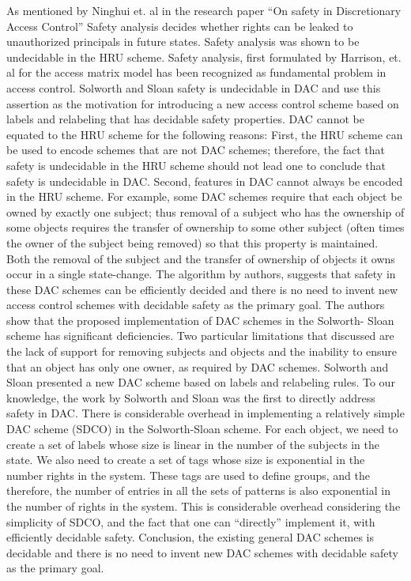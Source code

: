\documentclass{report}
\begin{document}
As mentioned by Ninghui et. al in the research paper “On safety in Discretionary Access
Control” Safety analysis decides whether rights can be leaked to unauthorized principals in
future states. Safety analysis was shown to be undecidable in the HRU scheme. Safety analysis,
first formulated by Harrison, et. al for the access matrix model has been recognized as
fundamental problem in access control. Solworth and Sloan safety is undecidable in DAC and
use this assertion as the motivation for introducing a new access control scheme based on
labels and relabeling that has decidable safety properties.
DAC cannot be equated to the HRU scheme for the following reasons:
First, the HRU scheme can be used to encode schemes that are not DAC schemes; therefore,
the fact that safety is undecidable in the HRU scheme should not lead one to conclude that
safety is undecidable in DAC.
Second, features in DAC cannot always be encoded in the HRU scheme. For example, some DAC
schemes require that each object be owned by exactly one subject; thus removal of a subject
who has the ownership of some objects requires the transfer of ownership to some other
subject (often times the owner of the subject being removed) so that this property is
maintained. Both the removal of the subject and the transfer of ownership of objects it owns
occur in a single state-change.
The algorithm by authors, suggests that safety in these DAC schemes can be efficiently decided
and there is no need to invent new access control schemes with decidable safety as the primary
goal. The authors show that the proposed implementation of DAC schemes in the Solworth-
Sloan scheme has significant deficiencies. Two particular limitations that discussed are the lack
of support for removing subjects and objects and the inability to ensure that an object has only
one owner, as required by DAC schemes. Solworth and Sloan presented a new DAC scheme
based on labels and relabeling rules. To our knowledge, the work by Solworth and Sloan was
the first to directly address safety in DAC.
There is considerable overhead in implementing a relatively simple DAC scheme (SDCO) in the
Solworth-Sloan scheme. For each object, we need to create a set of labels whose size is linear in
the number of the subjects in the state. We also need to create a set of tags whose size is
exponential in the number rights in the system. These tags are used to define groups, and the
therefore, the number of entries in all the sets of patterns is also exponential in the number of
rights in the system. This is considerable overhead considering the simplicity of SDCO, and the
fact that one can “directly” implement it, with efficiently decidable safety.
Conclusion, the existing general DAC schemes is decidable and there is no need to invent new
DAC schemes with decidable safety as the primary goal.
\end{document}
